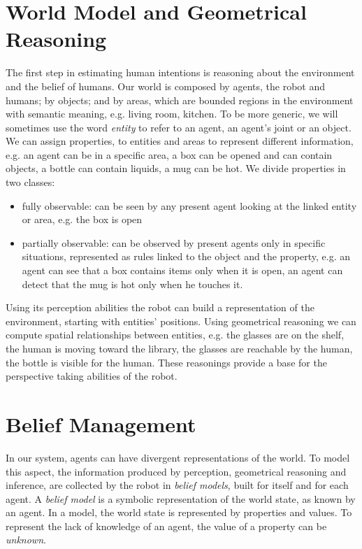 
\section{World Model and Geometrical Reasoning}
\label{sec:situation_assessment-situation_assessment}
The first step in estimating human intentions is reasoning about the environment and the belief of humans. Our world is composed by agents, the robot and humans; by objects; and by areas, which are bounded regions in the environment with semantic meaning, e.g. living room, kitchen. To be more generic, we will sometimes use the word \textit{entity} to refer to an agent, an agent's joint or an object. We can assign properties, to entities and areas to represent different information, e.g. 
an agent can be in a specific area, a box can be opened and can contain objects, a bottle can contain liquids, a mug can be hot. 
 We divide properties in two classes: 
\begin{itemize}
\item fully observable:  can be seen by any present agent looking at the linked entity or area, e.g. the box is open
\item partially observable: can be observed by present agents only in specific situations, represented as rules linked to the object and the property, e.g. an agent can see that a box contains items only when it is open, an agent can detect that the mug is hot only when he touches it.
\end{itemize}

Using its perception abilities the robot can build a representation of the environment, starting with entities' positions. Using geometrical reasoning we can compute spatial relationships between entities, e.g. the glasses are on the shelf, the human is moving toward the library, the glasses are reachable by the human, the bottle is visible for the human. These reasonings provide a base for the perspective taking abilities of the robot. 



\section{Belief Management}
\label{sec:situation_assessment-belief_management}
In our system, agents can have divergent representations of the world. To model this aspect, the information produced by perception, geometrical reasoning and inference, are collected by the robot in \textit{belief models}, built for itself and for each agent. A \textit{belief model} is a symbolic representation of the world state, as known by an agent. In a model, the world state is represented by properties and values. To represent the lack of knowledge of an agent, the value of a property can be \textit{unknown}.

